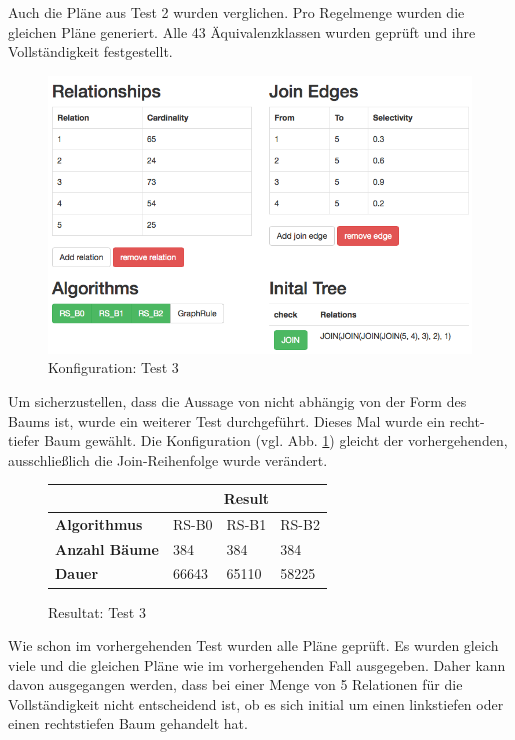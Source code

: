 Auch die Pläne aus Test 2 wurden verglichen. Pro Regelmenge wurden die gleichen Pläne generiert. Alle 43 Äquivalenzklassen wurden geprüft und ihre Vollständigkeit festgestellt.

\begin{figure}[ht]
  \centering
  \includegraphics[width=\textwidth]{05_ResultsEvaluation/00_media/Test3.png}
  \caption{Konfiguration: Test 3}
  \label{Konfiguration:Test3}
\end{figure}


Um sicherzustellen, dass die Aussage von \cite{shanbhag2014optimizing} nicht abhängig von der Form des Baums ist, wurde ein weiterer Test durchgeführt. Dieses Mal wurde ein recht-tiefer Baum gewählt. Die Konfiguration (vgl. Abb. \ref{Konfiguration:Test3}) gleicht der vorhergehenden, ausschließlich die Join-Reihenfolge wurde verändert.

\begin{figure}[ht]
\centering
\begin{tabular}{|l|l|l|l|}
\hline
                         & \multicolumn{3}{c|}{{\bf Result}} \\ \hline
{\bf Algorithmus}        & RS-B0     & RS-B1     & RS-B2     \\ \hline
{\bf Anzahl Bäume}       & 384       & 384       & 384       \\ \hline
{\bf Dauer}              & 66643  & 65110  & 58225  \\ \hline
\end{tabular}

\caption{Resultat: Test 3}
\label{Result:Test3}
\end{figure}


Wie schon im vorhergehenden Test wurden alle Pläne geprüft. Es wurden gleich viele und die gleichen Pläne wie im vorhergehenden Fall ausgegeben. Daher kann davon ausgegangen werden, dass bei einer Menge von 5 Relationen für die Vollständigkeit nicht entscheidend ist, ob es sich initial um einen linkstiefen oder einen rechtstiefen Baum gehandelt hat.



